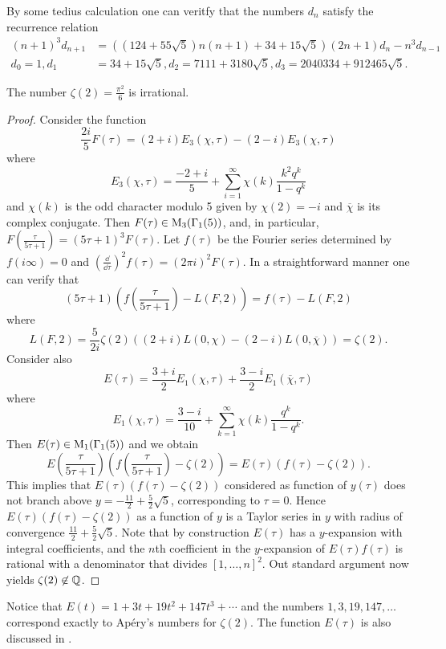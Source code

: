 \begin{remark*}
By some tedius calculation one can veritfy that the numbers $d_n$ satisfy the recurrence relation 
\begin{align*}
    (n + 1)^{3} d_{n+1} &= ((124 + 55\sqrt{5})n(n+1) + 34 + 15\sqrt{5}) (2n + 1)d_n - n^3 d_{n-1} \\
    d_0 = 1, d_1 &= 34 + 15\sqrt{5}, d_2 = 7111 + 3180 \sqrt{5}, d_3 = 2040334 + 912465\sqrt{5}.
\end{align*}
\end{remark*}

\begin{theorem}
\label{thm:5}
The number $\zeta(2) = \frac{\pi^2}{6}$ is irrational.
\end{theorem}
\begin{proof}
Consider the function
$$
    \frac{2i}{5} F(\tau) = (2 + i) E_3(\chi, \tau) - (2 - i) E_3(\chi, \tau)
$$
where
$$
    E_3(\chi, \tau) = \frac{-2 + i}{5} + \sum_{i=1}^{\infty} \chi(k) \frac{k^2 q^k}{1 - q^k}
$$
and $\chi(k)$ is the odd character modulo 5 given by $\chi(2) = -i$ and $\overline{\chi}$ is its complex conjugate.
Then $F(\tau) \in \mathrm{M}_3(\Gamma_1(5))$, and, in particular, $F(\frac{\tau}{5\tau + 1}) = (5\tau + 1)^{3} F(\tau)$.
Let $f(\tau)$ be the Fourier series determined by $f(i\infty) = 0$ and $\left(\frac{\dd}{\dd \tau}\right)^{2} f(\tau) = (2 \pi i)^{2} F(\tau)$.
In a straightforward manner one can verify that
$$
    (5\tau + 1)\left(f\left(\frac{\tau}{5\tau + 1}\right) - L(F, 2)\right)= f(\tau) - L(F, 2)
$$
where
$$
    L(F, 2) = \frac{5}{2i} \zeta(2) ((2 + i)L(0, \chi) - (2 - i) L(0, \overline{\chi})) = \zeta(2).
$$
Consider also
$$
    E(\tau) = \frac{3 + i}{2} E_1(\chi, \tau) + \frac{3 - i}{2} E_1(\overline{\chi}, \tau)
$$
where
$$
    E_1(\chi, \tau) = \frac{3 - i}{10} + \sum_{k=1}^{\infty} \chi(k) \frac{q^k}{1 - q^k}.
$$
Then $E(\tau) \in \mathrm{M}_1(\Gamma_1(5))$ and we obtain
$$
    E\left(\frac{\tau}{5\tau + 1}\right) \left(f\left(\frac{\tau}{5\tau + 1}\right) - \zeta(2)\right) = E(\tau) (f(\tau) - \zeta(2)).
$$
This implies that $E(\tau)(f(\tau) - \zeta(2))$ considered as function of $y(\tau)$ does not branch above $y = -\frac{11}{2} + \frac{5}{2}\sqrt{5}$, corresponding to $\tau = 0$.
Hence $E(\tau)(f(\tau) - \zeta(2))$ as a function of $y$ is a Taylor series in $y$ with radius of convergence $\frac{11}{2} + \frac{5}{2}\sqrt{5}$.
Note that by construction $E(\tau)$ has a $y$-expansion with integral coefficients, and the $n$th coefficient in the $y$-expansion of $E(\tau)f(\tau)$ is rational with a denominator that divides $[1, \dots, n]^{2}$.
Out standard argument now yields $\zeta(2) \not\in \mathbb{Q}$.
\end{proof}

\begin{remark*}
Notice that $E(t) = 1 + 3t + 19 t^2 + 147 t^3 + \cdots$ and the numbers $1, 3, 19, 147, \dots$ correspond exactly to Ap\'ery's numbers for $\zeta(2)$.
The function $E(\tau)$ is also discussed in \cite[p59]{beukers1985some}.
\end{remark*}